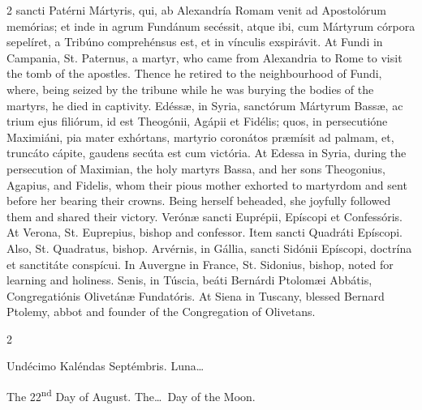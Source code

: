 \begin{paracol}{2}
 sancti Patérni Mártyris, qui, ab Alexandría Romam venit ad Apostolórum 
 memórias; et inde in agrum Fundánum secéssit, atque ibi, cum Mártyrum 
 córpora sepelíret, a Tribúno comprehénsus est, et in vínculis exspirávit.
\switchcolumn
{}
At Fundi in Campania, St. Paternus, 
 a martyr, who came from Alexandria to Rome to visit the tomb of the 
 apostles. Thence he retired to the neighbourhood of Fundi, where, 
 being seized by the tribune while he was burying the bodies of the martyrs, 
 he died in captivity.
\switchcolumn*
{}
Edéssæ, in Syria, 
 sanctórum Mártyrum Bassæ, ac trium ejus filiórum, id est Theogónii, Agápii 
 et Fidélis; quos, in persecutióne Maximiáni, pia mater exhórtans, martyrio 
 coronátos præmísit ad palmam, et, truncáto cápite, gaudens secúta est cum 
 victória.
\switchcolumn
{}
At Edessa in Syria, during the 
 persecution of Maximian, the holy martyrs Bassa, and her sons Theogonius, 
 Agapius, and Fidelis, whom their pious mother exhorted to martyrdom and sent 
 before her bearing their crowns. Being herself beheaded, she joyfully 
 followed them and shared their victory.
\switchcolumn*
{}
Verónæ sancti Euprépii, 
 Epíscopi et Confessóris.
\switchcolumn
{}
At Verona, St. Euprepius, bishop and 
 confessor.
\switchcolumn*
{}
Item sancti Quadráti 
 Epíscopi.
\switchcolumn
{}
Also, St. Quadratus, bishop.
\switchcolumn*
{}
Arvérnis, in Gállia, 
 sancti Sidónii Epíscopi, doctrína et sanctitáte conspícui.
\switchcolumn
{}
In Auvergne in France, St. Sidonius, 
 bishop, noted for learning and holiness.
\switchcolumn*
{}
Senis, in Túscia, beáti 
 Bernárdi Ptolomæi Abbátis, Congregatiónis Olivetánæ Fundatóris.
\switchcolumn
{}
At Siena in Tuscany, blessed Bernard 
 Ptolemy, abbot and founder of the Congregation of Olivetans.
\switchcolumn*
{}
\end{paracol}


\begin{paracol}{2}
\begin{center}{\color{gregoriocolor} Undécimo Kaléndas Septémbris. 
 Luna\dots\ }\end{center}
\switchcolumn
{}
\begin{center}{\color{gregoriocolor} The 
 22\textsuperscript{nd} Day of 
 August. The\dots\ Day of the Moon.}\end{center}
\end{paracol}

